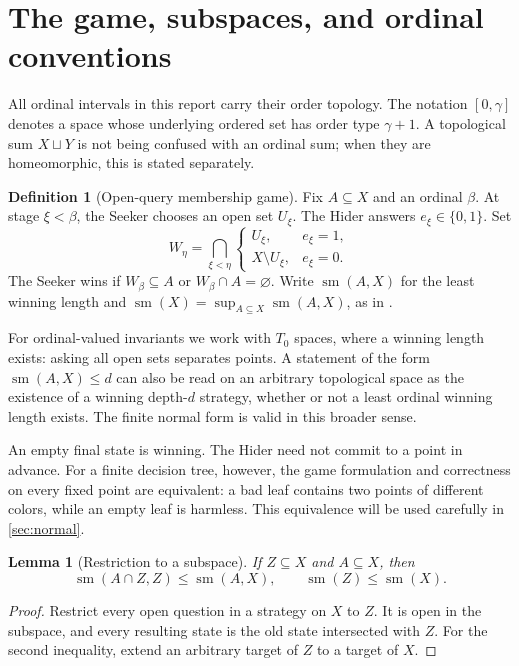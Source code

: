 \documentclass[11pt,letterpaper]{article}
\numberwithin{equation}{section}
\newtheorem{lemma}[lemma]{Lemma}
\theoremstyle{definition}
\newtheorem{definition}[definition]{Definition}
\theoremstyle{remark}
\newcommand{\sm}{\operatorname{sm}}
\begin{document}
\section{The game, subspaces, and ordinal conventions}

All ordinal intervals in this report carry their order topology. The notation
$[0,\gamma]$ denotes a space whose underlying ordered set has order type
$\gamma+1$. A topological sum $X\sqcup Y$ is not being confused with an ordinal
sum; when they are homeomorphic, this is stated separately.

\begin{definition}[Open-query membership game]
Fix $A\subseteq X$ and an ordinal $\beta$. At stage $\xi<\beta$, the Seeker
chooses an open set $U_\xi$. The Hider answers $e_\xi\in\{0,1\}$. Set
\[
 W_\eta=\bigcap_{\xi<\eta}
 \begin{cases}
  U_\xi,&e_\xi=1,\\
  X\setminus U_\xi,&e_\xi=0.
 \end{cases}
\]
The Seeker wins if $W_\beta\subseteq A$ or $W_\beta\cap A=\varnothing$.
Write $\sm(A,X)$ for the least winning length and
$\sm(X)=\sup_{A\subseteq X}\sm(A,X)$, as in \cite{CCS}.
\end{definition}

For ordinal-valued invariants we work with $T_0$ spaces, where a winning
length exists: asking all open sets separates points. A statement of the form
$\sm(A,X)\leq d$ can also be read on an arbitrary topological space as the
existence of a winning depth-$d$ strategy, whether or not a least ordinal
winning length exists. The finite normal form is valid in this broader sense.

An empty final state is winning. The Hider need not commit to a point in advance.
For a finite decision tree, however, the game formulation and correctness on
every fixed point are equivalent: a bad leaf contains two points of different
colors, while an empty leaf is harmless. This equivalence will be used carefully
in \cref{sec:normal}.

\begin{lemma}[Restriction to a subspace]\label{lem:subspace}
If $Z\subseteq X$ and $A\subseteq X$, then
\[
 \sm(A\cap Z,Z)\leq\sm(A,X),\qquad \sm(Z)\leq\sm(X).
\]
\end{lemma}
\begin{proof}
Restrict every open question in a strategy on $X$ to $Z$. It is open in the
subspace, and every resulting state is the old state intersected with $Z$.
For the second inequality, extend an arbitrary target of $Z$ to a target of $X$.
\end{proof}
\end{document}
